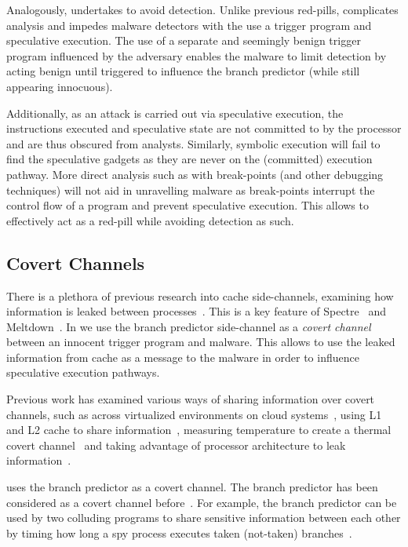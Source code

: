 Analogously, \speculake undertakes to avoid detection. Unlike previous
red-pills, \speculake complicates analysis and impedes malware detectors with
the use a trigger program and speculative execution. The use of a separate and
seemingly benign trigger program influenced by the adversary enables the
\speculake malware to limit detection by acting benign until triggered to
influence the branch predictor (while still appearing innocuous). 

Additionally, as an \speculake attack is carried out via speculative execution,
the instructions executed and speculative state are not committed to by the
processor and are thus obscured from analysts. Similarly, symbolic execution
will fail to find the speculative gadgets as they are never on the (committed)
execution pathway. More direct analysis such as with break-points (and other
debugging techniques) will not aid in unravelling \speculake malware as
break-points interrupt the control flow of a program and prevent speculative
execution. This allows \speculake to effectively act as a red-pill while
avoiding detection as such.


\subsection{Covert Channels}

There is a plethora of previous research into cache side-channels, examining how
information is leaked between
processes~\cite{percival2005cache,zhang2012cross,osvik2006cache}. This is a key
feature of Spectre~\cite{spectre} and Meltdown~\cite{meltdown}. In \speculake we
use the branch predictor side-channel as a \emph{covert
channel}~\cite{lampson1973note} between an innocent trigger program and malware.
This allows \speculake to use the leaked information from cache as a message to
the malware in order to influence speculative execution pathways.

Previous work has examined various ways of sharing information over covert
channels, such as across virtualized environments on cloud
systems~\cite{wu2012whispers}, using L1 and L2 cache to share
information~\cite{percival2005cache}, measuring temperature to create a thermal
covert channel~\cite{masti2015thermal, bartolini2016capacity} and taking
advantage of processor architecture to leak information~\cite{wang2006covert}.

\speculake uses the branch predictor as a covert channel. The branch predictor
has been considered as a covert channel
before~\cite{evtyushkin2016understanding}. For example, the branch predictor can
be used by two colluding programs to share sensitive information between each
other by timing how long a spy process executes taken (not-taken)
branches~\cite{evtyushkin2015covert}.

